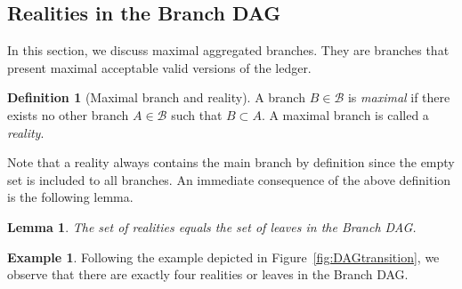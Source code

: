 \documentclass[11pt]{article}
\newcommand{\branchset}{\mathcal{B}}
\theoremstyle{plain}
\newtheorem{lemma}{Lemma}
\theoremstyle{definition}
\newtheorem{definition}{Definition}
\newtheorem{example}{Example}
\numberwithin{definition}{section}
\numberwithin{lemma}{section}
\numberwithin{ass}{section}
\numberwithin{remark}{section}
\numberwithin{example}{section}
\numberwithin{proposition}{section}
\numberwithin{theorem}{section}
\begin{document}
\subsection{Realities in the  Branch DAG}\label{sec:realities}
In this section, we discuss maximal aggregated branches.
They are branches that present maximal acceptable valid versions of the ledger.

\begin{definition}[Maximal branch and reality]\label{def: reality}
A branch ${B}\in\branchset$ is \emph{maximal} if there exists no other branch $A\in\branchset$ such that  ${B}\subset A$. A maximal branch is called a \textit{reality}.
\end{definition}
Note that a reality always contains the main branch by definition since the empty set is included to all branches. An immediate consequence of the above definition is the following lemma.
\begin{lemma}\label{lem:realityLeaf}
The set of realities equals the set of leaves in the Branch DAG.
\end{lemma}
\begin{example}
Following the example depicted in Figure~\ref{fig:DAGtransition}, we observe that there are exactly four realities or leaves in the Branch DAG.
\end{example}
\end{document}

